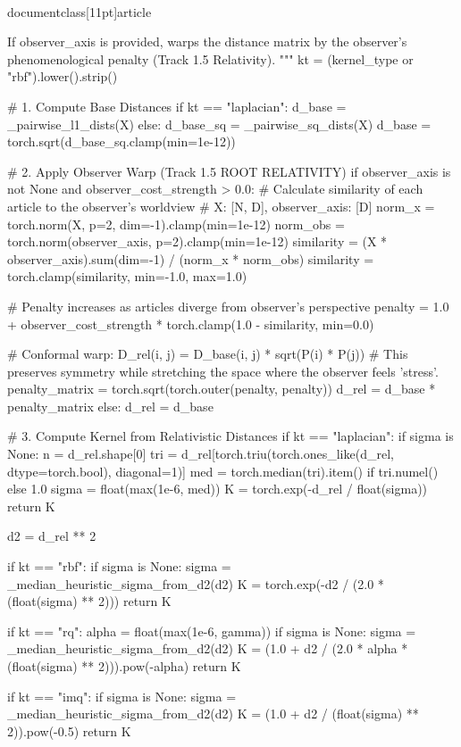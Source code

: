 \\documentclass[11pt]{article}
\begin{document}
\begin{CodeBlock}
    If observer_axis is provided, warps the distance matrix by the observer's
    phenomenological penalty (Track 1.5 Relativity).
    """
    kt = (kernel_type or "rbf").lower().strip()
    
    # 1. Compute Base Distances
    if kt == "laplacian":
        d_base = _pairwise_l1_dists(X)
    else:
        d_base_sq = _pairwise_sq_dists(X)
        d_base = torch.sqrt(d_base_sq.clamp(min=1e-12))

    # 2. Apply Observer Warp (Track 1.5 ROOT RELATIVITY)
    if observer_axis is not None and observer_cost_strength > 0.0:
        # Calculate similarity of each article to the observer's worldview
        # X: [N, D], observer_axis: [D]
        norm_x = torch.norm(X, p=2, dim=-1).clamp(min=1e-12)
        norm_obs = torch.norm(observer_axis, p=2).clamp(min=1e-12)
        similarity = (X * observer_axis).sum(dim=-1) / (norm_x * norm_obs)
        similarity = torch.clamp(similarity, min=-1.0, max=1.0)
        
        # Penalty increases as articles diverge from observer's perspective
        penalty = 1.0 + observer_cost_strength * torch.clamp(1.0 - similarity, min=0.0)
        
        # Conformal warp: D_rel(i, j) = D_base(i, j) * sqrt(P(i) * P(j))
        # This preserves symmetry while stretching the space where the observer feels 'stress'.
        penalty_matrix = torch.sqrt(torch.outer(penalty, penalty))
        d_rel = d_base * penalty_matrix
    else:
        d_rel = d_base

    # 3. Compute Kernel from Relativistic Distances
    if kt == "laplacian":
        if sigma is None:
            n = d_rel.shape[0]
            tri = d_rel[torch.triu(torch.ones_like(d_rel, dtype=torch.bool), diagonal=1)]
            med = torch.median(tri).item() if tri.numel() else 1.0
            sigma = float(max(1e-6, med))
        K = torch.exp(-d_rel / float(sigma))
        return K

    d2 = d_rel ** 2

    if kt == "rbf":
        if sigma is None:
            sigma = _median_heuristic_sigma_from_d2(d2)
        K = torch.exp(-d2 / (2.0 * (float(sigma) ** 2)))
        return K

    if kt == "rq":
        alpha = float(max(1e-6, gamma))
        if sigma is None:
            sigma = _median_heuristic_sigma_from_d2(d2)
        K = (1.0 + d2 / (2.0 * alpha * (float(sigma) ** 2))).pow(-alpha)
        return K

    if kt == "imq":
        if sigma is None:
            sigma = _median_heuristic_sigma_from_d2(d2)
        K = (1.0 + d2 / (float(sigma) ** 2)).pow(-0.5)
        return K


\end{CodeBlock}
\end{document}
